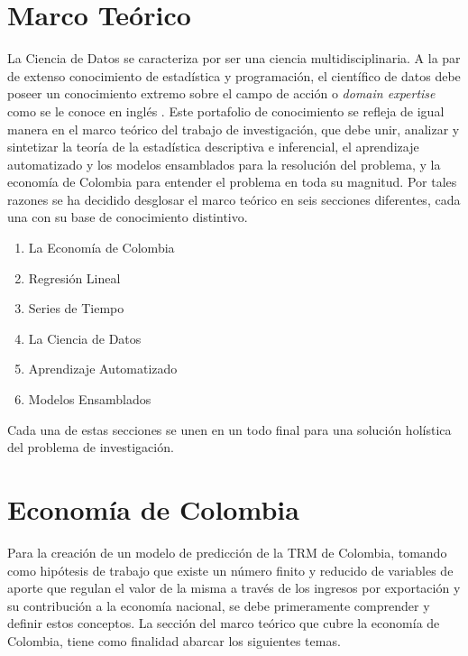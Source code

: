 \begin{spacing}{1.5}
\section{Marco Teórico}
La Ciencia de Datos se caracteriza por ser una ciencia multidisciplinaria. A la par de extenso conocimiento de estadística y programación, el científico de datos debe poseer un conocimiento extremo sobre el campo de acción o \textit{domain expertise} como se le conoce en inglés \cite{pengMatsui}. Este portafolio de conocimiento se refleja de igual manera en el marco teórico del trabajo de investigación, que debe unir, analizar y sintetizar la teoría de la estadística descriptiva e inferencial, el aprendizaje automatizado y los modelos ensamblados para la resolución del problema, y la economía de Colombia para entender el problema en toda su magnitud. Por tales razones se ha decidido desglosar el marco teórico en seis secciones diferentes, cada una con su base de conocimiento distintivo. 

\begin{enumerate}
    \item La Economía de Colombia
    \item Regresión Lineal
    \item Series de Tiempo
    \item La Ciencia de Datos
    \item Aprendizaje Automatizado
    \item Modelos Ensamblados
\end{enumerate}

Cada una de estas secciones se unen en un todo final para una solución holística del problema de investigación.

\section{Economía de Colombia}
Para la creación de un modelo de predicción de la TRM de Colombia, tomando como hipótesis de trabajo que existe un número finito y reducido de variables de aporte que regulan el valor de la misma a través de los ingresos por exportación y su contribución a la economía nacional, se debe primeramente comprender y definir estos conceptos. La sección del marco teórico que cubre la economía de Colombia, tiene como finalidad abarcar los siguientes temas. 


\end{spacing}
